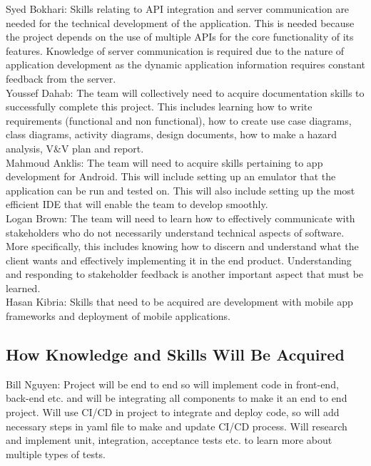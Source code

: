\documentclass[12pt,letterpaper]{article}
\begin{document}
\noindent Syed Bokhari: Skills relating to API integration and server communication are needed for the technical development of the application. This is needed because the project depends on the use of multiple APIs for the core functionality of its features. Knowledge of server communication is required due to the nature of application development as the dynamic application information requires constant feedback from the server. \\

\noindent Youssef Dahab: The team will collectively need to acquire documentation skills to successfully complete this project. This includes learning how to write requirements (functional and non functional), how to create use case diagrams, class diagrams, activity diagrams, design documents, how to make a hazard analysis, V\&V plan and report.\\

\noindent Mahmoud Anklis: The team will need to acquire skills pertaining to app development for Android. This will include setting up an emulator that the application can be run and tested on. This will also include setting up the most efficient IDE that will enable the team to develop smoothly.\\ 

\noindent Logan Brown: The team will need to learn how to effectively communicate with stakeholders who do not necessarily understand technical aspects of software. More specifically, this includes knowing how to discern and understand what the client wants and effectively implementing it in the end product. Understanding and responding to stakeholder feedback is another important aspect that must be learned.\\

\noindent Hasan Kibria: Skills that need to be acquired are development with mobile app frameworks and deployment of mobile applications.\\

\subsection{How Knowledge and Skills Will Be Acquired}

\noindent Bill Nguyen: Project will be end to end so will implement code in front-end, back-end etc. and will be integrating all components to make it an end to end project. Will use CI/CD in project to integrate and deploy code, so will add necessary steps in yaml file to make and update CI/CD process. Will research and implement unit, integration, acceptance tests etc. to learn more about multiple types of tests. \\
\end{document}
